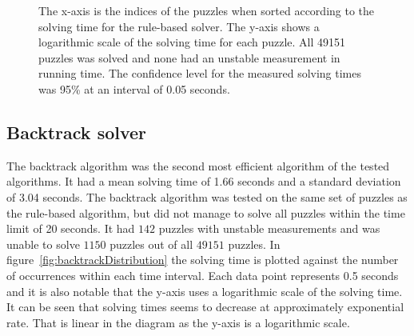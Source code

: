 \documentclass[a4paper,11pt]{kth-mag}
\begin{document}
\begin{figure}[here] 
\noindent{}
\vspace{-25pt}
\caption[Plot of solved puzzles using rule-based solver]{The x-axis is the indices of the puzzles when sorted according to the solving time for the rule-based solver. The y-axis shows a logarithmic scale of the solving time for each puzzle. All 49151 puzzles was solved and none had an unstable measurement in running time. The confidence level for the measured solving times was 95\% at an interval of 0.05 seconds.}
\label{fig:rulebasedIndices}
\end{figure}

\FloatBarrier
\subsection{Backtrack solver}
\label{sec:backtrack}
The backtrack algorithm was the second most efficient algorithm of the tested algorithms.
It had a mean solving time of 1.66 seconds and a standard deviation of 3.04 seconds.
The backtrack algorithm was tested on the same set of puzzles as the rule-based algorithm, but did not manage to solve all puzzles within the time limit of 20 seconds.
It had $142$ puzzles with unstable measurements and was unable to solve $1150$ puzzles out of all $49151$ puzzles.
In figure~\ref{fig:backtrackDistribution} the solving time is plotted against the number of occurrences within each time interval.
Each data point represents 0.5 seconds and it is also notable that the y-axis uses a logarithmic scale of the solving time.
It can be seen that solving times seems to decrease at approximately exponential rate.
That is linear in the diagram as the y-axis is a logarithmic scale.
\end{document}
